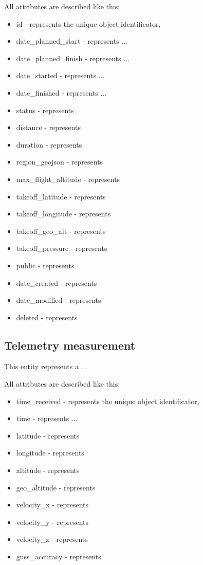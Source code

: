 All attributes are described like this:
\begin{itemize}
    \item id - represents the unique object identificator,
    \item date\_planned\_start - represents ...
    \item date\_planned\_finish - represents ...
    \item date\_started - represents ...
    \item date\_finished - represents ...
    \item status - represents
    \item distance - represents
    \item duration - represents
    \item region\_geojson - represents
    \item max\_flight\_altitude - represents
    \item takeoff\_latitude - represents
    \item takeoff\_longitude - represents
    \item takeoff\_geo\_alt - represents
    \item takeoff\_pressure - represents
    \item public - represents
    \item date\_created - represents
    \item date\_modified - represents
    \item deleted - represents
\end{itemize}

\subsection{Telemetry measurement}\label{subsec:telemetry-measurement}
This entity represents a ...

All attributes are described like this:
\begin{itemize}
    \item time\_received - represents the unique object identificator,
    \item time - represents ...
    \item latitude - represents
    \item longitude - represents
    \item altitude - represents
    \item geo\_altitude - represents
    \item velocity\_x - represents
    \item velocity\_y - represents
    \item velocity\_z - represents
    \item gnss\_accuracy - represents
\end{itemize}


